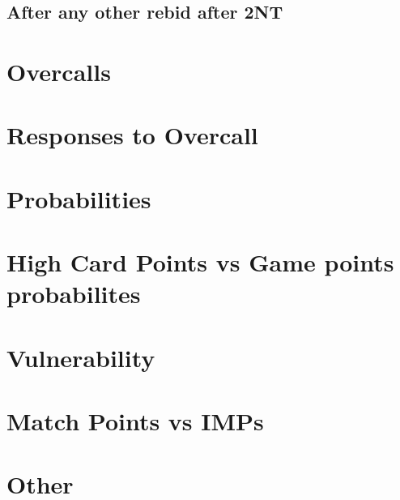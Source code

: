 \documentclass{article}
\newcommand{\NTs}{\textbf{\footnotesize{NT}}}
\newcommand{\NT}[1]{\textbf{#1\NTs}}
\begin{document}
\subsection{After any other rebid after \NT{2}}



\section{Overcalls}
\section{Responses to Overcall}

\section{Probabilities}
\section{High Card Points vs Game points probabilites}
\section{Vulnerability}
\section{Match Points vs IMPs}
\section{Other}
\end{document}
